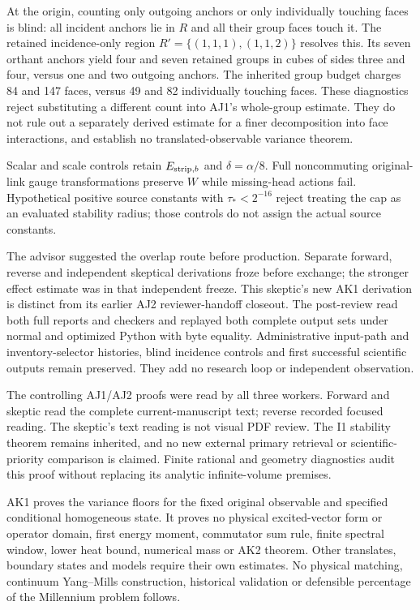 At the origin, counting only outgoing anchors or only individually touching faces is blind: all incident anchors lie in $R$ and all their group faces touch it. The retained incidence-only region $R'=\{(1,1,1),(1,1,2)\}$ resolves this. Its seven orthant anchors yield four and seven retained groups in cubes of sides three and four, versus one and two outgoing anchors. The inherited group budget charges 84 and 147 faces, versus 49 and 82 individually touching faces. These diagnostics reject substituting a different count into AJ1's whole-group estimate. They do not rule out a separately derived estimate for a finer decomposition into face interactions, and establish no translated-observable variance theorem.

Scalar and scale controls retain $E_{{\rm strip},b}$ and $\delta=\alpha/8$. Full noncommuting original-link gauge transformations preserve $W$ while missing-head actions fail. Hypothetical positive source constants with $\tau_*<2^{-16}$ reject treating the cap as an evaluated stability radius; those controls do not assign the actual source constants.

The advisor suggested the overlap route before production. Separate forward, reverse and independent skeptical derivations froze before exchange; the stronger effect estimate was in that independent freeze. This skeptic's new AK1 derivation is distinct from its earlier AJ2 reviewer-handoff closeout. The post-review read both full reports and checkers and replayed both complete output sets under normal and optimized Python with byte equality. Administrative input-path and inventory-selector histories, blind incidence controls and first successful scientific outputs remain preserved. They add no research loop or independent observation.

The controlling AJ1/AJ2 proofs were read by all three workers. Forward and skeptic read the complete current-manuscript text; reverse recorded focused reading. The skeptic's text reading is not visual PDF review. The I1 stability theorem remains inherited, and no new external primary retrieval or scientific-priority comparison is claimed. Finite rational and geometry diagnostics audit this proof without replacing its analytic infinite-volume premises.

AK1 proves the variance floors for the fixed original observable and specified conditional homogeneous state. It proves no physical excited-vector form or operator domain, first energy moment, commutator sum rule, finite spectral window, lower heat bound, numerical mass or AK2 theorem. Other translates, boundary states and models require their own estimates. No physical matching, continuum Yang--Mills construction, historical validation or defensible percentage of the Millennium problem follows.
